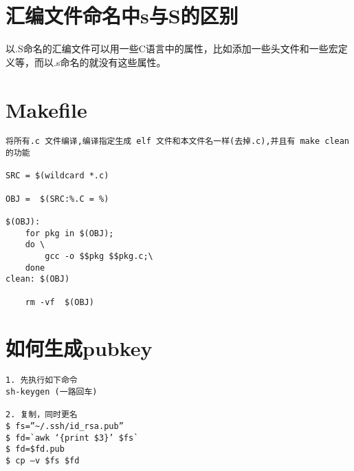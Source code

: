 \section{汇编文件命名中s与S的区别}
以.S命名的汇编文件可以用一些C语言中的属性，比如添加一些头文件和一些宏定义等，而以.s命名的就没有这些属性。

\section{Makefile}
\begin{verbatim}
将所有.c 文件编译,编译指定生成 elf 文件和本文件名一样(去掉.c),并且有 make clean 的功能

SRC = $(wildcard *.c)

OBJ =  $(SRC:%.C = %)

$(OBJ):
    for pkg in $(OBJ);
    do \
        gcc -o $$pkg $$pkg.c;\
    done
clean: $(OBJ)

    rm -vf  $(OBJ) 
\end{verbatim}

\section{如何生成pubkey}
\begin{verbatim}
1. 先执行如下命令
sh-keygen (一路回车)

2. 复制，同时更名
$ fs=”~/.ssh/id_rsa.pub”
$ fd=`awk ‘{print $3}’ $fs`
$ fd=$fd.pub
$ cp –v $fs $fd
\end{verbatim}

